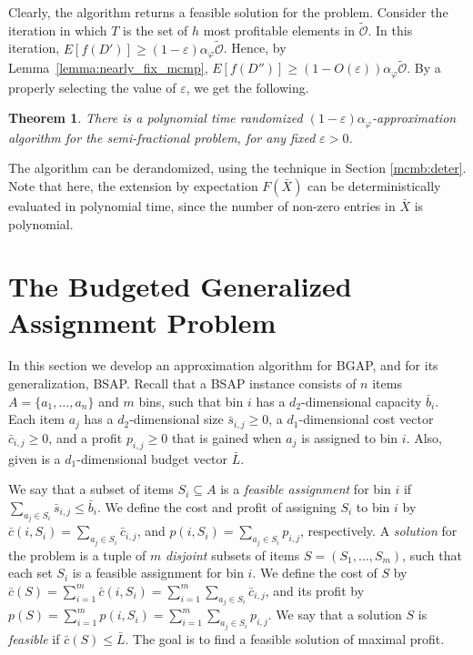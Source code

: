 \documentclass[11pt]{article}
\newtheorem{theorem}{Theorem}[section]
\newcommand{\eps}{\varepsilon}
\newcommand{\bs}{\bar{s}}
\newcommand{\bb}{\bar{b}}
\newcommand{\bS}{S}
\newcommand{\bL}{\bar{L}}
\newcommand{\bc}{\bar{c}}
\newcommand{\alphaf}{\alpha_\varphi}
\newcommand{\tmO}{\tilde{\mathcal{O}}}
\begin{document}
{Clearly, the algorithm returns a feasible solution for the problem. Consider
the iteration in which $T$ is the set of $h$ most profitable elements in $\tmO$.
In this iteration,  $E[f(D')] \geq (1- \eps) \alphaf \tmO$.
Hence, by Lemma~\ref{lemma:nearly_fix_mcmp},
$E[f(D'')] \geq (1 - O(\eps))\alphaf \tmO$.
By a properly selecting the value of $\eps$,
we get the following.

\begin{theorem}
\label{thm:semi_frac}
There is a polynomial time randomized $(1-\eps)\alphaf$-approximation algorithm for
the semi-fractional problem, for any fixed $\eps >0$.
\end{theorem}

The algorithm can be derandomized, using
the technique in Section \ref{mcmb:deter}.
Note that here, the extension by expectation $F(\bar{X})$
can be deterministically evaluated in polynomial time,
since the number of non-zero entries in $\bar{X}$ is polynomial.
\section{The Budgeted Generalized Assignment Problem}
\label{sec:bgap}


In this section we develop an approximation algorithm for BGAP, and for its generalization, BSAP.
Recall that a BSAP instance consists of $n$ items $A=\{a_1,\ldots,a_n\}$
and $m$ bins, such that bin $i$ has a $d_2$-dimensional capacity $\bb_i$. Each item $a_j$ has a
$d_2$-dimensional size $\bs_{i,j}\geq 0$, a $d_1$-dimensional cost vector $\bc_{i,j}\geq 0$, and
a profit $p_{i,j}\geq 0$ that is gained when $a_j$ is assigned to bin $i$.
Also, given is a $d_1$-dimensional budget vector $\bL$.

We say that a subset of items $S_i \subseteq A$ is a \emph{feasible assignment} for bin $i$ if
$\sum_{a_j \in S_i} \bs_{i,j} \leq \bb_i$. We define the
 cost and profit of assigning $S_i$ to bin $i$ by
$\bc(i,S_i) = \sum_{a_j \in S_i} \bc_{i,j}$, and
$p(i,S_i) = \sum_{a_j\in S_i} p_{i,j}$, respectively.
A \emph{solution} for the problem is a tuple of $m$ {\em disjoint} subsets of items $\bS=(S_1,\ldots,S_m)$,
such that each set $S_i$ is a feasible assignment for bin $i$.
We define the cost of $\bS$ by
$\bc(\bS) = \sum_{i=1}^{m} \bc(i,S_i) = \sum_{i=1}^{m} \sum_{a_j\in S_i} \bc_{i,j}$,
and its profit by
$p(\bS) = \sum_{i=1}^{m} p(i,S_i) = \sum_{i=1}^{m} \sum_{a_j\in S_i} p_{i,j}$.
We say that a solution $\bS$ is \emph{feasible} if $\bc(\bS)  \leq \bL$.
The goal is to find a feasible solution of maximal profit.


}
\end{document}
